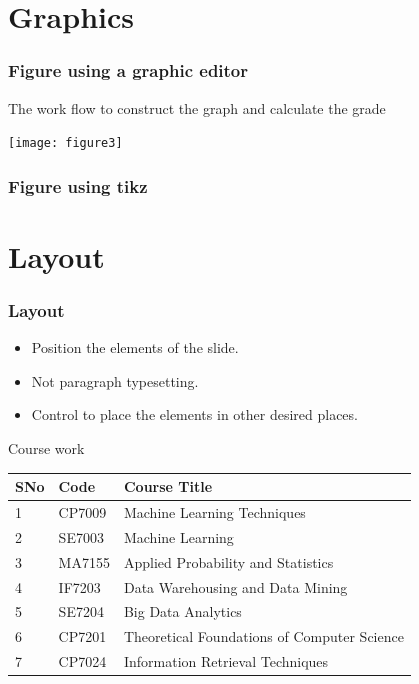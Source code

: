 \documentclass[11pt]{beamer}
\begin{document}
\section{Graphics}
\begin{frame}
  \frametitle{Figure using a graphic editor}
  The work flow to construct the graph and calculate the grade
  \begin{center}
    \texttt{[image: figure3]}
  \end{center}
\end{frame}

\begin{frame}
  \frametitle{Figure using tikz}
  \begin{center}
    
  \end{center}
\end{frame}

\section{Layout}
\begin{frame}
  \frametitle{Layout}
  \begin{itemize}
  \item Position the elements of the slide.
  \item Not paragraph typesetting.
  \item Control to place the elements in other desired places.
  \end{itemize}
\end{frame}

\begin{frame}{Course work}

  \begin{tabular}{lll}
    SNo & Code & Course Title\\\hline
    1 & CP7009 & Machine Learning Techniques\\
    2 & SE7003 & Machine Learning\\
    3 & MA7155 & Applied Probability and Statistics \\    
    4 & IF7203 & Data Warehousing and Data Mining \\
    5 & SE7204 & Big Data Analytics\\
    6 & CP7201 & Theoretical Foundations  of Computer Science\\
    7 & CP7024 & Information Retrieval Techniques \\
  \end{tabular} 
\end{frame}
\end{document}
